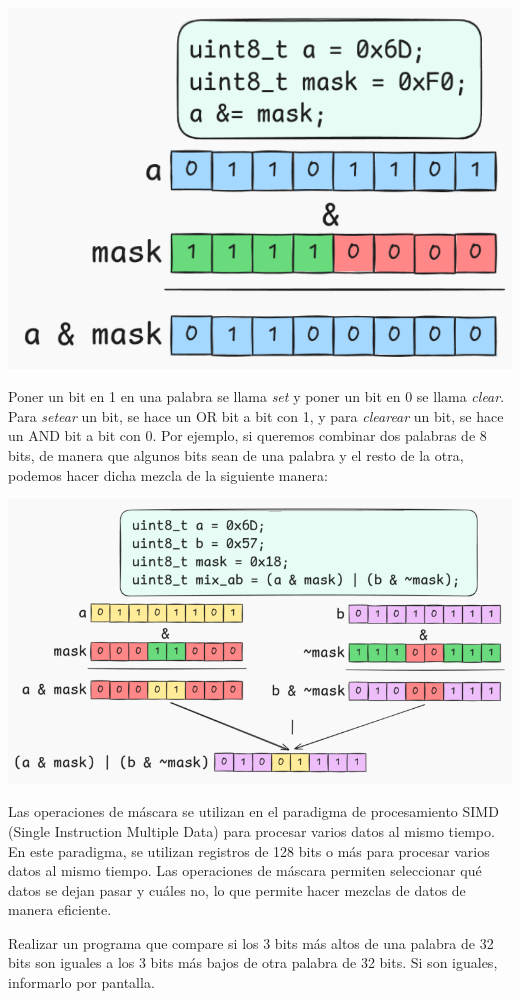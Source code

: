 \documentclass[]{scrartcl}
\begin{document}
\begin{center}
  \includegraphics[scale=0.3]{./img/mask.png}
  \label{fig:masking}
\end{center}

Poner un bit en 1 en una palabra se llama \textit{set} y poner un bit en 0 se llama \textit{clear}. Para \textit{setear} un bit, se hace un OR bit a bit con 1, y para \textit{clearear} un bit, se hace un AND bit a bit con 0.
Por ejemplo, si queremos combinar dos palabras de 8 bits, de manera que algunos bits sean de una palabra y el resto de la otra, podemos hacer dicha mezcla de la siguiente manera:

\begin{center}
  \includegraphics[scale=0.4]{./img/mask_multiple.png}
  \label{fig:masking_mix}
\end{center}

Las operaciones de máscara se utilizan en el paradigma de procesamiento SIMD (Single Instruction Multiple Data) para procesar varios datos al mismo tiempo. En este paradigma, se utilizan registros de 128 bits o más para procesar varios datos al mismo tiempo. Las operaciones de máscara permiten seleccionar qué datos se dejan pasar y cuáles no, lo que permite hacer mezclas de datos de manera eficiente.
\begin{exbox}
  Realizar un programa que compare si los 3 bits más altos de una palabra de 32 bits son iguales a los 3 bits más bajos de otra palabra de 32 bits. Si son iguales, informarlo por pantalla. 
\end{exbox}
\end{document}
